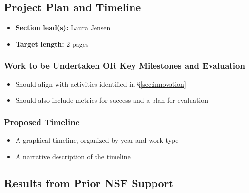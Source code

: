 \documentclass[10pt]{NSF}
\begin{document}
\subsection{Project Plan and Timeline}
\label{sec:plan}

\begin{itemize}
\item{\textbf{Section lead(s):} Laura Jensen}
\item{\textbf{Target length:} 2 pages}
\end{itemize}

\subsubsection{Work to be Undertaken OR Key Milestones and Evaluation}
\label{sec:milestones}

\begin{itemize}
\item{Should align with activities identified in
    \S\ref{sec:innovation}}
\item{Should also include metrics for success and a plan for evaluation}
\end{itemize}


\subsubsection{Proposed Timeline}
\label{sec:timeline}

\begin{itemize}
\item{A graphical timeline, organized by year and work type}
\item{A narrative description of the timeline}
\end{itemize}

\subsection{Results from Prior NSF Support}
\label{sec:prior_support}
\end{document}
